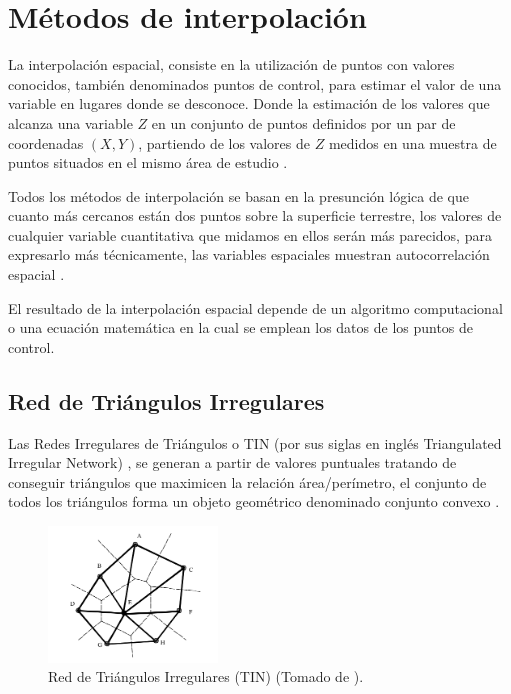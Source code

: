\section{Métodos de interpolación}
\label{sec:cap2-metodos-interpolacion}
La interpolación espacial, consiste en la utilización de puntos con valores conocidos, también
denominados puntos de control, para estimar el valor de una variable en lugares donde se
desconoce. Donde la estimación de los valores que alcanza una variable $Z$ en un conjunto de
puntos definidos por un par de coordenadas $(X,Y)$, partiendo de los valores de $Z$ medidos en
una muestra de puntos situados en el mismo área de estudio \citep{fAlonsoSig2006}.


Todos los métodos de interpolación se basan en la presunción lógica de que cuanto más cercanos
están dos puntos sobre la superficie terrestre, los valores de cualquier variable cuantitativa que
midamos en ellos serán más parecidos, para expresarlo más técnicamente, las variables espaciales
muestran autocorrelación espacial \citep{fAlonsoSig2006}.

El resultado de la interpolación espacial depende de un algoritmo computacional o una ecuación
matemática en la cual se emplean los datos de los puntos de control\cite{NINO2011}.


\subsection {Red de Triángulos Irregulares}
Las Redes Irregulares de Triángulos o TIN (por sus siglas en inglés Triangulated Irregular Network)
, se generan a partir de valores puntuales tratando de conseguir triángulos que maximicen la
relación área/perímetro, el conjunto de todos los triángulos forma un objeto geométrico
denominado conjunto convexo \citet{fAlonsoSig2006}.

\begin{figure}[H]
\centering
\includegraphics[width=0.4\textwidth]{capitulo-2/graphics/TIN-cPachecoMDE2003.png}
\caption{\label{fig:sig-tin}Red de Triángulos Irregulares (TIN) (Tomado de \cite{cPachecoMDE2003}).}
\end{figure}

